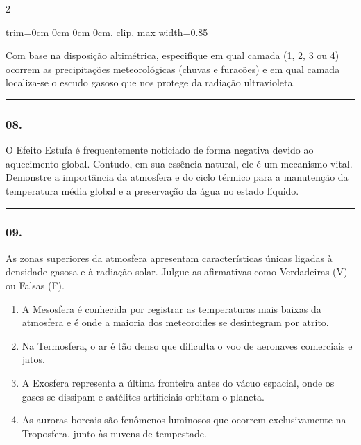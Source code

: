 \documentclass[twoside, 10pt, a4paper]{article}
\newlength{\espacoPreQuestao}
\newlength{\espacoQuestao}
\newlength{\espacoAlt}
\newcommand{\larguraTikz}{0.85\linewidth} %
\begin{document}
\begin{multicols*}{2}
\begin{center}
\begin{adjustbox}{trim=0cm 0cm 0cm 0cm, clip, max width=\larguraTikz}
\end{adjustbox}
\end{center}

Com base na disposição altimétrica, especifique em qual camada (1, 2, 3 ou 4) ocorrem as precipitações meteorológicas (chuvas e furacões) e em qual camada localiza-se o escudo gasoso que nos protege da radiação ultravioleta.
\par\vspace{\espacoQuestao}

\noindent\textcolor{CorLinha}{\rule{\linewidth}{0.5pt}} 
\par\vspace{\espacoPreQuestao}
\subsubsection*{08.} O Efeito Estufa é frequentemente noticiado de forma negativa devido ao aquecimento global. Contudo, em sua essência natural, ele é um mecanismo vital. Demonstre a importância da atmosfera e do ciclo térmico para a manutenção da temperatura média global e a preservação da água no estado líquido.
\par\vspace{\espacoQuestao}

\noindent\textcolor{CorLinha}{\rule{\linewidth}{0.5pt}} 
\par\vspace{\espacoPreQuestao}
\subsubsection*{09.} As zonas superiores da atmosfera apresentam características únicas ligadas à densidade gasosa e à radiação solar. Julgue as afirmativas como Verdadeiras (V) ou Falsas (F).

\begin{enumerate}[label=(\ \ ), itemsep=\espacoAlt]
\item A Mesosfera é conhecida por registrar as temperaturas mais baixas da atmosfera e é onde a maioria dos meteoroides se desintegram por atrito.
\item Na Termosfera, o ar é tão denso que dificulta o voo de aeronaves comerciais e jatos.
\item A Exosfera representa a última fronteira antes do vácuo espacial, onde os gases se dissipam e satélites artificiais orbitam o planeta.
\item As auroras boreais são fenômenos luminosos que ocorrem exclusivamente na Troposfera, junto às nuvens de tempestade.
\end{enumerate}
\par\vspace{\espacoQuestao}


\end{multicols*}
\end{document}
